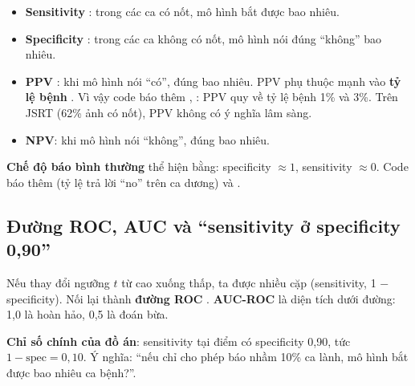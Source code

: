 \begin{itemize}
\item \textbf{Sensitivity} : trong các ca có nốt, mô hình bắt được bao nhiêu.
\item \textbf{Specificity} : trong các ca không có nốt, mô hình nói đúng ``không'' bao nhiêu.
\item \textbf{PPV} : khi mô hình nói ``có'', đúng bao nhiêu.
      PPV phụ thuộc mạnh vào \textbf{tỷ lệ bệnh} . Vì vậy code báo thêm , :
      PPV quy về tỷ lệ bệnh 1\% và 3\%. Trên JSRT (62\% ảnh có nốt), PPV không có ý nghĩa lâm sàng.
\item \textbf{NPV}: khi mô hình nói ``không'', đúng bao nhiêu.
\end{itemize}

\textbf{Chế độ báo bình thường} thể hiện bằng: specificity $\approx 1$, sensitivity $\approx 0$. Code báo thêm
 (tỷ lệ trả lời ``no'' trên ca dương) và .

\subsection{Đường ROC, AUC và ``sensitivity ở specificity 0,90''}
\label{sec:roc}

Nếu thay đổi ngưỡng $t$ từ cao xuống thấp, ta được nhiều cặp (sensitivity, 1 $-$ specificity). Nối lại thành
\textbf{đường ROC} . \textbf{AUC-ROC}  là diện tích dưới đường:
1,0 là hoàn hảo, 0,5 là đoán bừa.

\textbf{Chỉ số chính của đồ án}: sensitivity tại điểm có specificity 0,90, tức $1-\text{spec} = 0{,}10$.
Ý nghĩa: ``nếu chỉ cho phép báo nhầm 10\% ca lành, mô hình bắt được bao nhiêu ca bệnh?''.


